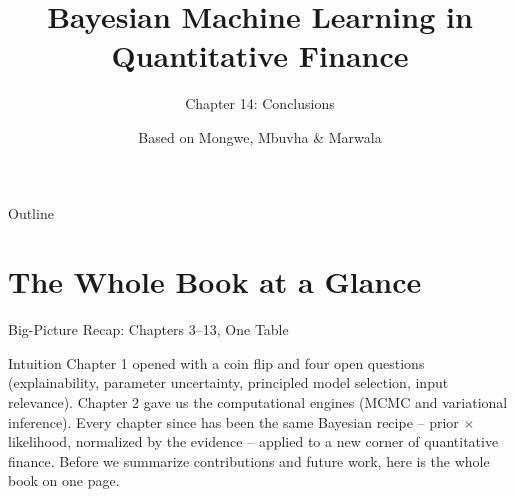 \documentclass[aspectratio=169,10pt]{beamer}
\title[Bayesian ML in QF -- Ch.14]{Bayesian Machine Learning in Quantitative Finance}
\subtitle{Chapter 14: Conclusions}
\author{Based on Mongwe, Mbuvha \& Marwala}
\date{}
\begin{document}

\begin{frame}
  \titlepage
\end{frame}

\begin{frame}{Outline}
  \tableofcontents
\end{frame}

\section{The Whole Book at a Glance}

\begin{frame}[allowframebreaks]{Big-Picture Recap: Chapters 3--13, One Table}
  \begin{block}{Intuition}
    Chapter 1 opened with a coin flip and four open questions
    (explainability, parameter uncertainty, principled model selection,
    input relevance). Chapter 2 gave us the computational engines
    (MCMC and variational inference). Every chapter since has been the
    same Bayesian recipe -- prior $\times$ likelihood, normalized by the
    evidence -- applied to a new corner of quantitative finance. Before we
    summarize contributions and future work, here is the whole book on
    one page.
  \end{block}


\end{frame}
\end{document}
